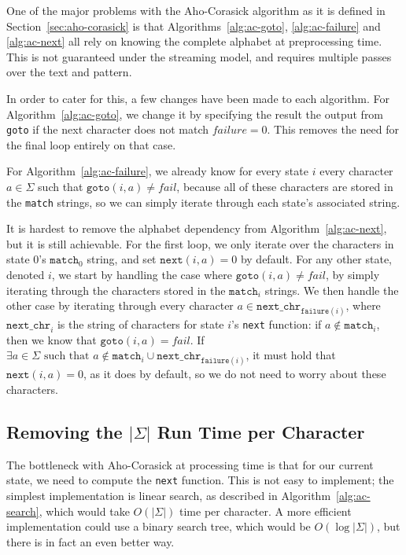 \documentclass[ %
                    author={Dominic Joseph Moylett},
                    degree={MEng},
                     title={Dictionary Matching with Fingerprints},
                  subtitle={An Empirical Analysis},
                      type={research},
                      year={2015} ]{dissertation}
\begin{document}
One of the major problems with the Aho-Corasick algorithm as it is defined in Section~\ref{sec:aho-corasick} is that Algorithms~\ref{alg:ac-goto}, \ref{alg:ac-failure} and \ref{alg:ac-next} all rely on knowing the complete alphabet at preprocessing time. This is not guaranteed under the streaming model, and requires multiple passes over the text and pattern.

In order to cater for this, a few changes have been made to each algorithm. For Algorithm~\ref{alg:ac-goto}, we change it by specifying the result the output from \texttt{goto} if the next character does not match $failure = 0$. This removes the need for the final loop entirely on that case.

For Algorithm~\ref{alg:ac-failure}, we already know for every state $i$ every character $a \in \Sigma$ such that $\texttt{goto}(i, a) \neq fail$, because all of these characters are stored in the \texttt{match} strings, so we can simply iterate through each state's associated string.

It is hardest to remove the alphabet dependency from Algorithm~\ref{alg:ac-next}, but it is still achievable. For the first loop, we only iterate over the characters in state 0's $\texttt{match}_{0}$ string, and set $\texttt{next}(i, a) = 0$ by default. For any other state, denoted $i$, we start by handling the case where $\texttt{goto}(i, a) \neq fail$, by simply iterating through the characters stored in the $\texttt{match}_i$ strings. We then handle the other case by iterating through every character $a \in \texttt{next\_chr}_{\texttt{failure}(i)}$, where $\texttt{next\_chr}_i$ is the string of characters for state $i$'s \texttt{next} function: if $a \notin \texttt{match}_i$, then we know that $\texttt{goto}(i, a) = fail$. If $\exists a \in \Sigma \text{ such that } a \notin \texttt{match}_i \cup \texttt{next\_chr}_{\texttt{failure}(i)}$, it must hold that $\texttt{next}(i, a) = 0$, as it does by default, so we do not need to worry about these characters.

\subsection{Removing the $|\Sigma|$ Run Time per Character}

The bottleneck with Aho-Corasick at processing time is that for our current state, we need to compute the \texttt{next} function. This is not easy to implement; the simplest implementation is linear search, as described in Algorithm~\ref{alg:ac-search}, which would take $O(|\Sigma|)$ time per character. A more efficient implementation could use a binary search tree, which would be $O(\log|\Sigma|)$, but there is in fact an even better way.
\end{document}
